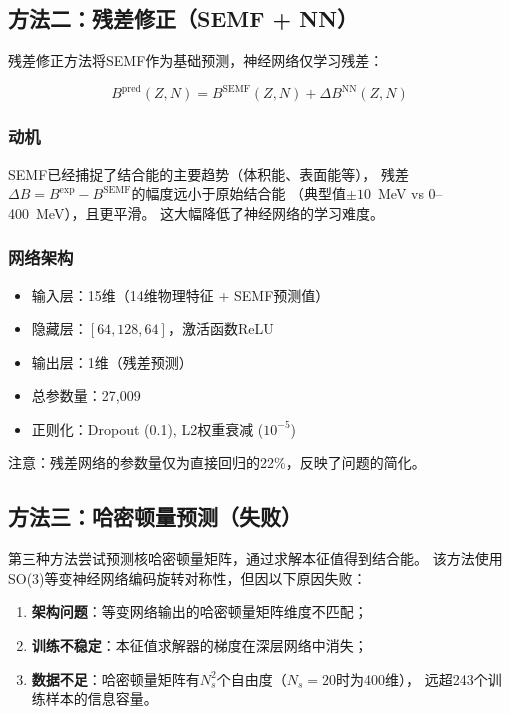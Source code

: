 \documentclass[12pt, a4paper]{article}
\begin{document}
\subsection{方法二：残差修正（SEMF + NN）}

残差修正方法将SEMF作为基础预测，神经网络仅学习残差：

\begin{equation}
  B^{\text{pred}}(Z, N) = B^{\text{SEMF}}(Z, N) + \Delta B^{\text{NN}}(Z, N)
\end{equation}

\subsubsection{动机}

SEMF已经捕捉了结合能的主要趋势（体积能、表面能等），
残差$\Delta B = B^{\text{exp}} - B^{\text{SEMF}}$的幅度远小于原始结合能
（典型值$\pm 10$~MeV vs 0--400~MeV），且更平滑。
这大幅降低了神经网络的学习难度。

\subsubsection{网络架构}

\begin{itemize}
  \item 输入层：15维（14维物理特征 + SEMF预测值）
  \item 隐藏层：$[64, 128, 64]$，激活函数ReLU
  \item 输出层：1维（残差预测）
  \item 总参数量：27,009
  \item 正则化：Dropout (0.1), L2权重衰减 ($10^{-5}$)
\end{itemize}

注意：残差网络的参数量仅为直接回归的22\%，反映了问题的简化。

\subsection{方法三：哈密顿量预测（失败）}

第三种方法尝试预测核哈密顿量矩阵，通过求解本征值得到结合能。
该方法使用SO(3)等变神经网络编码旋转对称性，但因以下原因失败：

\begin{enumerate}
  \item \textbf{架构问题}：等变网络输出的哈密顿量矩阵维度不匹配；
  \item \textbf{训练不稳定}：本征值求解器的梯度在深层网络中消失；
  \item \textbf{数据不足}：哈密顿量矩阵有$N_s^2$个自由度（$N_s = 20$时为400维），
        远超243个训练样本的信息容量。
\end{enumerate}
\end{document}
